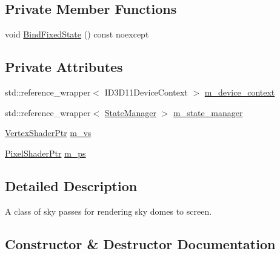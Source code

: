 \subsection*{Private Member Functions}
\begin{DoxyCompactItemize}
\item 
void \mbox{\hyperlink{classmage_1_1rendering_1_1_sky_pass_ab2e7bf506b3a038264579aa3c494f14d}{Bind\+Fixed\+State}} () const noexcept
\end{DoxyCompactItemize}
\subsection*{Private Attributes}
\begin{DoxyCompactItemize}
\item 
std\+::reference\+\_\+wrapper$<$ I\+D3\+D11\+Device\+Context $>$ \mbox{\hyperlink{classmage_1_1rendering_1_1_sky_pass_a5639f9eb6bf863074c5e5afba2f0e2f5}{m\+\_\+device\+\_\+context}}
\item 
std\+::reference\+\_\+wrapper$<$ \mbox{\hyperlink{classmage_1_1rendering_1_1_state_manager}{State\+Manager}} $>$ \mbox{\hyperlink{classmage_1_1rendering_1_1_sky_pass_aed4f451eb046158e856fdda6de9856f5}{m\+\_\+state\+\_\+manager}}
\item 
\mbox{\hyperlink{namespacemage_1_1rendering_aaf704b9c54a4181f4950a1761de69dda}{Vertex\+Shader\+Ptr}} \mbox{\hyperlink{classmage_1_1rendering_1_1_sky_pass_a935019dff57aaf9ae91f974ec59f11ee}{m\+\_\+vs}}
\item 
\mbox{\hyperlink{namespacemage_1_1rendering_af03d922b228ee9c8542baaa2ecc9f259}{Pixel\+Shader\+Ptr}} \mbox{\hyperlink{classmage_1_1rendering_1_1_sky_pass_a945613544f942b4278454a89bb5e1513}{m\+\_\+ps}}
\end{DoxyCompactItemize}


\subsection{Detailed Description}
A class of sky passes for rendering sky domes to screen. 

\subsection{Constructor \& Destructor Documentation}
\mbox{\label{classmage_1_1rendering_1_1_sky_pass_a55e8ef167a1e70a88a4be1fd11aed70e}} 
